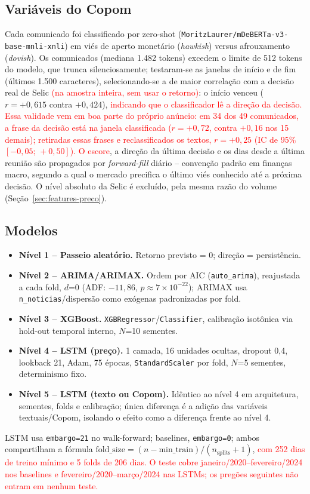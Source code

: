 \documentclass[conference]{IEEEtran}
\newcommand{\novo}[1]{\textcolor{red}{#1}}
\begin{document}
\subsection{Vari\'aveis do Copom}
Cada comunicado foi classificado por zero-shot (\texttt{MoritzLaurer/mDeBERTa-v3-base-mnli-xnli}) em vi\'es de aperto monet\'ario (\emph{hawkish}) versus afrouxamento (\emph{dovish}). Os comunicados (mediana 1.482 tokens) excedem o limite de 512 tokens do modelo, que trunca silenciosamente; testaram-se as janelas de in\'icio e de fim (\'ultimos 1.500 caracteres), selecionando-se a de maior correla\c{c}\~ao com a decis\~ao real de Selic \novo{(na amostra inteira, sem usar o retorno)}: o in\'icio venceu ($r=+0{,}615$ contra $+0{,}424$), \novo{indicando que o classificador l\^e a dire\c{c}\~ao da decis\~ao. Essa validade vem em boa parte do pr\'oprio an\'uncio: em 34 dos 49 comunicados, a frase da decis\~ao est\'a na janela classificada ($r=+0{,}72$, contra $+0{,}16$ nos 15 demais); retiradas essas frases e reclassificados os textos, $r=+0{,}25$ (IC de 95\% $[-0{,}05;\,+0{,}50]$).} \novo{O escore}, a dire\c{c}\~ao da \'ultima decis\~ao e os dias desde a \'ultima reuni\~ao s\~ao propagados por \emph{forward-fill} di\'ario -- conven\c{c}\~ao padr\~ao em finan\c{c}as macro, segundo a qual o mercado precifica o \'ultimo vi\'es conhecido at\'e a pr\'oxima decis\~ao. O n\'ivel absoluto da Selic \'e exclu\'ido, pela mesma raz\~ao do volume (Se\c{c}\~ao~\ref{sec:features-preco}).

\subsection{Modelos}
\begin{itemize}
\item \textbf{N\'ivel 1 -- Passeio aleat\'orio.} Retorno previsto = 0; dire\c{c}\~ao = persist\^encia.
\item \textbf{N\'ivel 2 -- ARIMA/ARIMAX.} Ordem por AIC (\texttt{auto\_arima}), reajustada a cada fold, $d$=0 (ADF: $-11{,}86$, $p\approx7\times10^{-22}$); ARIMAX usa \texttt{n\_noticias}/dispers\~ao como ex\'ogenas padronizadas por fold.
\item \textbf{N\'ivel 3 -- XGBoost.} \texttt{XGBRegressor}/\texttt{Classifier}, calibra\c{c}\~ao isot\^onica via hold-out temporal interno, $N$=10 sementes.
\item \textbf{N\'ivel 4 -- LSTM (pre\c{c}o).} 1 camada, 16 unidades ocultas, dropout 0,4, lookback 21, Adam, 75 \'epocas, \texttt{StandardScaler} por fold, $N$=5 sementes, determinismo fixo.
\item \textbf{N\'ivel 5 -- LSTM (texto ou Copom).} Id\^entico ao n\'ivel 4 em arquitetura, sementes, folds e calibra\c{c}\~ao; \'unica diferen\c{c}a \'e a adi\c{c}\~ao das vari\'aveis textuais/Copom, isolando o efeito como a diferen\c{c}a frente ao n\'ivel 4.
\end{itemize}
LSTM usa \texttt{embargo=21} no walk-forward; baselines, \texttt{embargo=0}; ambos compartilham a f\'ormula $\text{fold\_size}=(n-\text{min\_train})/(n_{\text{splits}}+1)$, \novo{com 252 dias de treino m\'inimo e 5 folds de 206 dias. O teste cobre janeiro/2020--fevereiro/2024 nos baselines e fevereiro/2020--mar\c{c}o/2024 nas LSTMs; os preg\~oes seguintes n\~ao entram em nenhum teste.}
\end{document}
